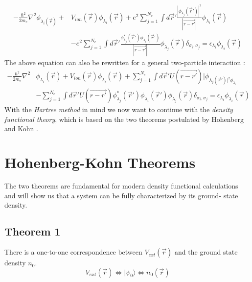 		\begin{equation}
			\begin{split}
				-\frac{\hbar^2}{2m_e} \nabla^2 \phi_{\lambda_i(\vec r)} + & V_{ion}(\vec r) \phi_{\lambda_i}(\vec r) + e^2 \sum_{j=1}^{N_e} \int d \vec r' \frac{|\phi_{\lambda_j}(\vec r')|^2}{|\vec{r -r'}|} \phi_{\lambda_i}(\vec r) \\ &
				- e^2 \sum_{j=1}^{N_e} \int d \vec r' \frac{\phi_{\lambda_j}^*(\vec r') \phi_{\lambda_i}(\vec r')}{|\vec{r - r'}|}\phi_{\lambda_j}(\vec r) \delta_{\sigma_i, \sigma_j} = \epsilon_{\lambda_i} \phi_{\lambda_i}(\vec r)
			\end{split}
		\end{equation}
		The above equation can also be rewritten for a general two-particle interaction :
		\begin{equation}
			\begin{split}
				- \frac{\hbar^2}{2m_e} \nabla^2 & \phi_{\lambda_i}(\vec r) + V_{ion}(\vec r)\phi_{\lambda_i}(\vec r) + \sum_{j=1}^{N_e} \int d \vec r' U(\vec{r - r'}) |\phi_{\lambda_j(\vec r')|^2 \phi_{\lambda_i}} \\ & - \sum_{j=1}^{N_e} \int d \vec r' U(\vec{r - r'})\phi_{\lambda_j}^*(\vec r') \phi_{\lambda_i}(\vec r') \phi_{\lambda_j}(\vec r) \delta_{\sigma_i, \sigma_j} = \epsilon_{\lambda_i} \phi_{\lambda_i}(\vec r)
			\end{split}
		\end{equation}	
		With the \textit{Hartree method} in mind we now want to continue with the \textit{density functional theory}, which is based on the two theorems postulated by Hohenberg and Kohn \cite{HohenbergKohn}.
	
	\section{Hohenberg-Kohn Theorems}
		The two theorems are fundamental for modern density functional calculations and will show us that a system can be fully characterized by its ground- state density.
	
		\subsection*{Theorem 1}
			There is a one-to-one correspondence between $V_{ext}(\vec{r})$ and the ground state density $n_0$. 
			\begin{equation}
				V_{ext}(\vec{r}) \Leftrightarrow |\psi_0 \rangle \Leftrightarrow n_0(\vec{r})
			\end{equation}
		
